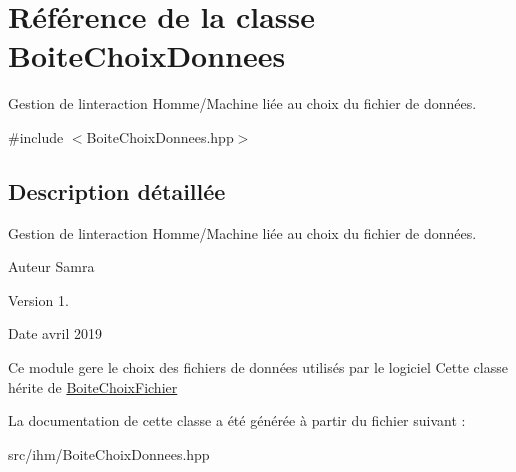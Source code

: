 \hypertarget{classBoiteChoixDonnees}{}\section{Référence de la classe Boite\+Choix\+Donnees}
\label{classBoiteChoixDonnees}


Gestion de l\textquotesingle{}interaction Homme/\+Machine liée au choix du fichier de données.  




{\ttfamily \#include $<$Boite\+Choix\+Donnees.\+hpp$>$}



\subsection{Description détaillée}
Gestion de l\textquotesingle{}interaction Homme/\+Machine liée au choix du fichier de données. 

\begin{DoxyAuthor}{Auteur}
Samra 
\end{DoxyAuthor}
\begin{DoxyVersion}{Version}
1. 
\end{DoxyVersion}
\begin{DoxyDate}{Date}
avril 2019
\end{DoxyDate}
Ce module gere le choix des fichiers de données utilisés par le logiciel Cette classe hérite de \hyperlink{classBoiteChoixFichier}{Boite\+Choix\+Fichier} 

La documentation de cette classe a été générée à partir du fichier suivant \+:\begin{DoxyCompactItemize}
\item 
src/ihm/Boite\+Choix\+Donnees.\+hpp\end{DoxyCompactItemize}

